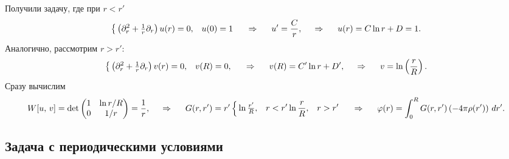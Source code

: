 Получили задачу, где при $r < r'$
\begin{equation*}
    \left\{\begin{aligned}
        &\left(\partial_r^2 + \tfrac{1}{r} \partial_r\right) u(r) = 0,
        &u(0) = 1
    \end{aligned}\right.
    \hspace{0.5cm} \Rightarrow \hspace{0.5cm}
    u' = \frac{C}{r},
    \hspace{0.5cm} \Rightarrow \hspace{0.5cm}
    u(r) = C \ln r + D = 1.
\end{equation*}
Аналогично, рассмотрим $r > r'$:
\begin{equation*}
    \left\{\begin{aligned}
        &\left(\partial_r^2 + \tfrac{1}{r} \partial_r\right) v(r) = 0,
        &v(R) = 0,
    \end{aligned}\right.
    \hspace{0.5cm} \Rightarrow \hspace{0.5cm}  
    v(R) = C' \ln r + D',
    \hspace{0.5cm} \Rightarrow \hspace{0.5cm}   
    v = \ln \left(\frac{r}{R}\right).
\end{equation*}
Сразу вычислим 
\begin{equation*}
    W[u,\,  v] = \det \begin{pmatrix}
        1 & \ln r/R  \\
        0 & 1/r  \\
    \end{pmatrix} = \frac{1}{r},
    \hspace{0.5cm} \Rightarrow \hspace{0.5cm}
    G(r, r') = r' \left\{\begin{aligned}
        & \ln \tfrac{r'}{R}, & r < r'
        & \ln \frac{r}{R}, & r > r'
    \end{aligned}\right.
    \hspace{0.5cm} \Rightarrow \hspace{0.5cm}
    \varphi(r) = \int_{0}^{R} G(r, r') \left(- 4 \pi \rho(r')\right) \, d r'.
\end{equation*}




\subsection{Задача с периодическими условиями}

